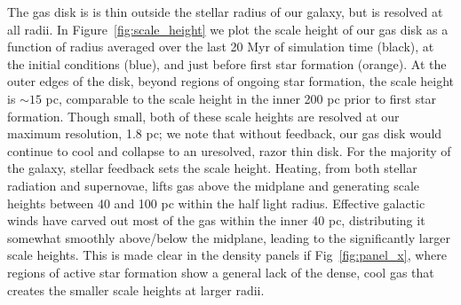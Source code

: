 \documentclass[twocolumn]{aastex61}
\begin{document}
The gas disk is is thin outside the stellar radius of our galaxy, but is resolved at all radii. In Figure~\ref{fig:scale_height} we plot the scale height of our gas disk as a function of radius averaged over the last 20 Myr of simulation time (black), at the initial conditions (blue), and just before first star formation (orange). At the outer edges of the disk, beyond regions of ongoing star formation, the scale height is $\sim 15$ pc, comparable to the scale height in the inner 200 pc prior to first star formation. Though small, both of these scale heights are resolved at our maximum resolution, 1.8 pc; we note that without feedback, our gas disk would continue to cool and collapse to an uresolved, razor thin disk. For the majority of the galaxy, stellar feedback sets the scale height. Heating, from both stellar radiation and supernovae, lifts gas above the midplane and generating scale heights between 40 and 100 pc within the half light radius. Effective galactic winds have carved out most of the gas within the inner 40 pc, distributing it somewhat smoothly above/below the midplane, leading to the significantly larger scale heights. This is made clear in the density panels if Fig~\ref{fig:panel_x}, where regions of active star formation show a general lack of the dense, cool gas that creates the smaller scale heights at larger radii.
\end{document}
